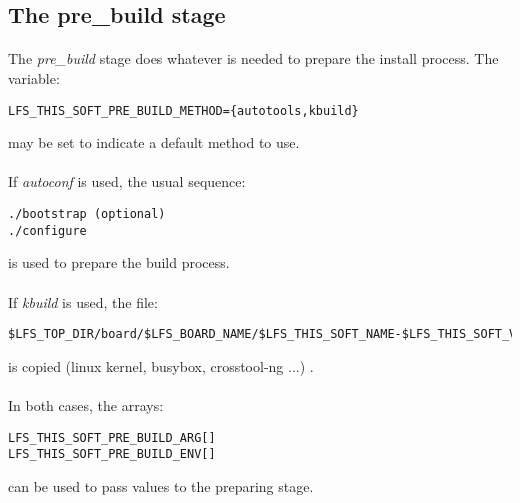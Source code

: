 \documentclass[a4paper, 11pt]{article}
\begin{document}
\subsection{The pre\_build stage}
\paragraph{}
The \textit{pre\_build} stage does whatever is needed to prepare the install
process. The variable:\\

\begin{lstlisting}[frame=tb]
LFS_THIS_SOFT_PRE_BUILD_METHOD={autotools,kbuild}
\end{lstlisting}
may be set to indicate a default method to use.

\paragraph{}
If \textit{autoconf} is used, the usual sequence:\\

\begin{lstlisting}[frame=tb]
./bootstrap (optional)
./configure
\end{lstlisting}
is used to prepare the build process.

\paragraph{}
If \textit{kbuild} is used, the file:\\

\begin{small}
\begin{lstlisting}[frame=tb]
$LFS_TOP_DIR/board/$LFS_BOARD_NAME/$LFS_THIS_SOFT_NAME-$LFS_THIS_SOFT_VERS.config
\end{lstlisting}
\end{small}
is copied (linux kernel, busybox, crosstool-ng ...) .

\paragraph{}
In both cases, the arrays:\\

\begin{lstlisting}[frame=tb]
LFS_THIS_SOFT_PRE_BUILD_ARG[]
LFS_THIS_SOFT_PRE_BUILD_ENV[]
\end{lstlisting}
can be used to pass values to the preparing stage.
\end{document}
